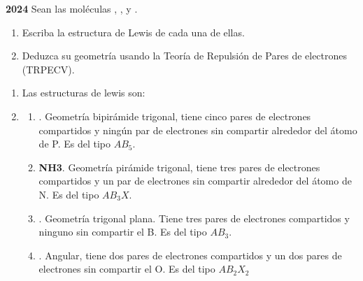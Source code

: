 \begin{exerciseEVAU}
    \textbf{2024} Sean las moléculas , ,  y .
    \begin{enumerate}[label=\letraminuscula]
        \item Escriba la estructura de Lewis de cada una de ellas.
        \item Deduzca su geometría usando la Teoría de Repulsión de Pares de electrones (TRPECV).
    \end{enumerate}

    \begin{solu}
        \begin{enumerate}[label=\letraminuscula]
            \item Las estructuras de lewis son:

            \begin{center}
                \hspace{1.5cm}
                \hspace{1.5cm}
                \hspace{1.5cm}
            \end{center}
            \item
            \begin{enumerate}[label=\letraminuscula]
                \item {}. Geometría bipirámide trigonal, tiene cinco pares de electrones compartidos y ningún par de electrones sin compartir alrededor del átomo de P. Es del tipo \( AB_5 \).
                \item \textbf{NH3}. Geometría pirámide trigonal, tiene tres pares de electrones compartidos y un par de electrones sin compartir alrededor del átomo de N. Es del tipo \( AB_3X \).
                \item \textbf{}. Geometría trigonal plana. Tiene tres pares de electrones compartidos y ninguno sin compartir el B. Es del tipo \( AB_3 \).
                \item \textbf{}. Angular, tiene dos pares de electrones compartidos y un dos pares de electrones sin compartir el O. Es del tipo \( AB_2X_2 \)
            \end{enumerate}
        \end{enumerate}
    \end{solu}
\end{exerciseEVAU}

